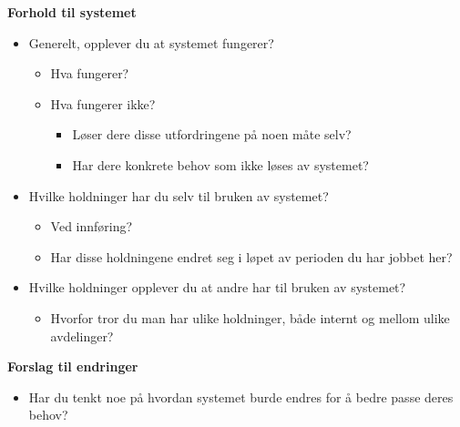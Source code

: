 \noindent
\textbf{Forhold til systemet}
\begin{itemize}
	\item Generelt, opplever du at systemet fungerer?
	\begin{itemize}
		\item Hva fungerer?
		\item Hva fungerer ikke?
		\begin{itemize}
			\item Løser dere disse utfordringene på noen måte selv?
			\item Har dere konkrete behov som ikke løses av systemet?
		\end{itemize}
	\end{itemize}
	\item Hvilke holdninger har du selv til bruken av systemet?
		\begin{itemize}
			\item Ved innføring?
			\item Har disse holdningene endret seg i løpet av perioden du har jobbet her?
		\end{itemize}
	\item Hvilke holdninger opplever du at andre har til bruken av systemet?
		\begin{itemize}
			\item Hvorfor tror du man har ulike holdninger, både internt og mellom ulike avdelinger?
		\end{itemize}
\end{itemize}
 
 \noindent
\textbf{Forslag til endringer}
\begin{itemize}
	\item Har du tenkt noe på hvordan systemet burde endres for å bedre passe deres behov?
\end{itemize} 
